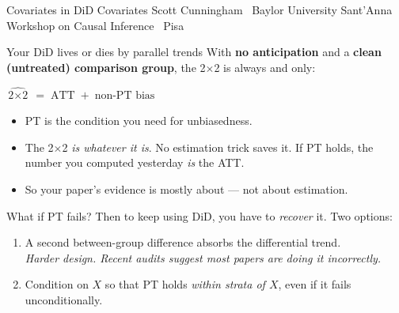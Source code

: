 \documentclass[aspectratio=169,11pt]{beamer}
\begin{document}

\codechellatitle
  {Covariates in DiD}
  {Covariates}
  {Scott Cunningham \textperiodcentered\ Baylor University}
  {Sant'Anna Workshop on Causal Inference \textperiodcentered\ Pisa}

\begin{frame}{Your DiD lives or dies by parallel trends}
\vspace{0.5em}
With \textbf{no anticipation} and a \textbf{clean (untreated) comparison group}, the 2$\times$2 is always and only:
\vspace{0.3em}
\begin{center}
\Large
$\widehat{\text{2}\times\text{2}} \;=\; \text{ATT} \;+\; \text{non-PT bias}$
\end{center}
\vspace{0.4em}
\begin{itemize}
  \item PT is the  condition you need for unbiasedness.
  \item The 2$\times$2 \textit{is whatever it is}. No estimation trick saves it. If PT holds, the number you computed yesterday \textit{is} the ATT.
  \item So your paper's evidence is mostly about  --- not about estimation.
\end{itemize}
\end{frame}

\begin{frame}{What if PT fails?}
\vspace{0.5em}
Then to keep using DiD, you have to \textit{recover} it. Two options:
\vspace{0.5em}
\begin{enumerate}\setlength\itemsep{0.5em}
  \item {} A second between-group difference absorbs the differential trend. \\
        \textit{Harder design. Recent audits suggest most papers are doing it incorrectly.}
  \item {} Condition on $X$ so that PT holds \textit{within strata of $X$}, even if it fails unconditionally.
\end{enumerate}
\vspace{0.7em}
\end{frame}
\end{document}
